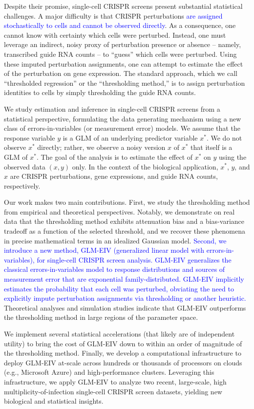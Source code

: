 \documentclass[12pt]{article}
\newcommand{\blue}[1]{\textcolor{blue}{#1}}
\begin{document}
Despite their promise, single-cell CRISPR screens present substantial statistical challenges. A major difficulty is that CRISPR perturbations \blue{are assigned stochastically to cells and cannot be observed directly}. As a consequence, one cannot know with certainty which cells were perturbed. Instead, one must leverage an indirect, noisy proxy of perturbation presence or absence -- namely, transcribed guide RNA counts -- to ``guess'' which cells were perturbed. Using these imputed perturbation assignments, one can attempt to estimate the effect of the perturbation on gene expression. The standard approach, which we call ``thresholded regression'' or the ``thresholding method,'' is to assign perturbation identities to cells by simply thresholding the guide RNA counts.

We study estimation and inference in single-cell CRISPR screens from a statistical perspective, formulating the data generating mechanism using a new class of errors-in-variables (or measurement error) models. We assume that the response variable $y$ is a GLM of an underlying predictor variable $x^*$. We do not observe $x^*$ directly; rather, we observe a noisy version $x$ of $x^*$ that itself is a GLM of $x^*$. The goal of the analysis is to estimate the effect of $x^*$ on $y$ using the observed data $(x , y)$ only. In the context of the biological application, $x^*$, $y$, and $x$ are CRISPR perturbations, gene expressions, and guide RNA counts, respectively.

Our work makes two main contributions. First, we study the thresholding method from empirical and theoretical perspectives. Notably, we demonstrate on real data that the thresholding method exhibits attenuation bias and a bias-variance tradeoff as a function of the selected threshold, and we recover these phenomena in precise mathematical terms in an idealized Gaussian model. \blue{Second, we introduce a new method, GLM-EIV (generalized linear model with errors-in-variables), for single-cell CRISPR screen analysis. GLM-EIV generalizes the classical errors-in-variables model to response distributions and sources of measurement error that are exponential family-distributed. GLM-EIV implicitly estimates the probability that each cell was perturbed, obviating the need to explicitly impute perturbation assignments via thresholding or another heuristic.} Theoretical analyses and simulation studies indicate that GLM-EIV outperforms the thresholding method in large regions of the parameter space.

We implement several statistical accelerations (that likely are of independent utility) to bring the cost of GLM-EIV down to within an order of magnitude of the thresholding method. Finally, we develop a computational infrastructure to deploy GLM-EIV at-scale across hundreds or thousands of processors on clouds (e.g., Microsoft Azure) and high-performance clusters. Leveraging this infrastructure, we apply GLM-EIV to analyze two recent, large-scale, high multiplicity-of-infection single-cell CRISPR screen datasets, yielding new biological and statistical insights.
\end{document}
